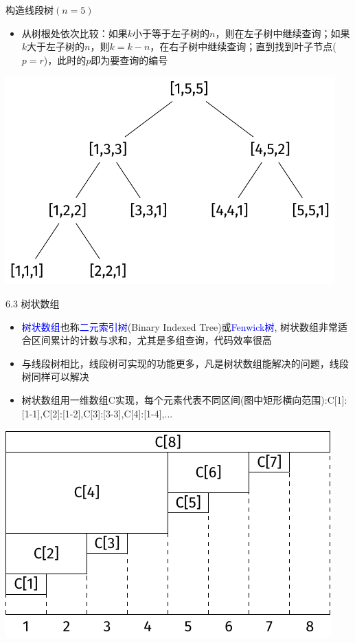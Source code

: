 \begin{frame}{构造线段树$(n=5)$}
    \begin{itemize}
        \item  从树根处依次比较：如果$k$小于等于左子树的$n$，则在左子树中继续查询；如果$k$大于左子树的$n$，则$k=k-n$，在右子树中继续查询；直到找到叶子节点($p=r$)，此时的$p$即为要查询的编号
    \end{itemize}
    \includegraphics[center]{fig/6-3.pdf}
\end{frame}
\begin{frame}{6.3 树状数组}
    \begin{itemize}
        \item \textcolor{blue}{树状数组}也称\textcolor{blue}{二元索引树}(Binary Indexed Tree)或\textcolor{blue}{Fenwick树}, 树状数组非常适合区间累计的计数与求和，尤其是多组查询，代码效率很高
        \item 与线段树相比，线段树可实现的功能更多，凡是树状数组能解决的问题，线段树同样可以解决
        \item 树状数组用一维数组C实现，每个元素代表不同区间(图中矩形横向范围):C[1]:[1-1],C[2]:[1-2],C[3]:[3-3],C[4]:[1-4],...
    \end{itemize}
    \includegraphics[scale=.8,center]{fig/6-4.pdf}
\end{frame}
